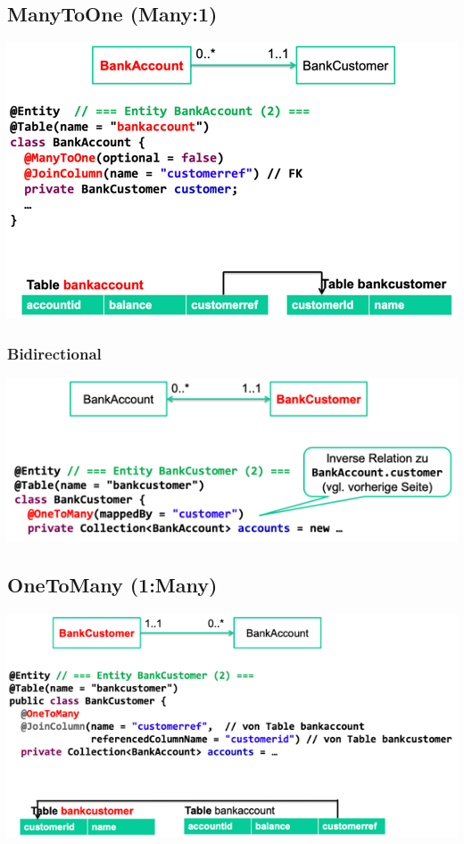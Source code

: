 \documentclass[a4paper, landscape, 8pt]{scrartcl}
\begin{document}
\begin{multicols*}{4}
        \subsection{ManyToOne (Many:1)}
        \includegraphics[scale=0.25]{graphic/05-many-to-one}
        \subsubsection{Bidirectional}
        \includegraphics[scale=0.25]{graphic/06-bidirectional-many-to-one}

        \subsection{OneToMany (1:Many)}
        \includegraphics[scale=0.25]{graphic/07-one-to-many}


\end{multicols*}
\end{document}
